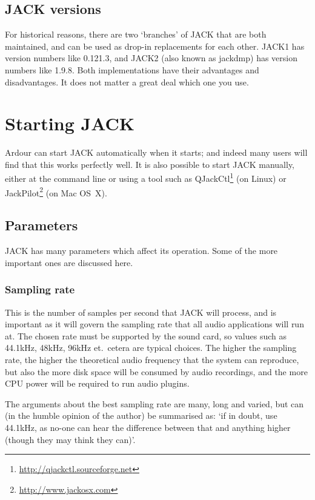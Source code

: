 \documentclass[10pt,a4paper]{book}
\begin{document}
{\subsection{JACK versions}

For historical reasons, there are two `branches' of JACK that are both
maintained, and can be used as drop-in replacements for each other.
JACK1 has version numbers like 0.121.3, and JACK2 (also known as
jackdmp) has version numbers like 1.9.8.  Both implementations have
their advantages and disadvantages.  It does not matter a great deal
which one you use.



\section{Starting JACK}

Ardour can start JACK automatically when it starts; and indeed many
users will find that this works perfectly well.  It is also possible
to start JACK manually, either at the command line or using a tool
such as QJackCtl\footnote{\url{http://qjackctl.sourceforge.net}} (on
Linux) or JackPilot\footnote{\url{http://www.jackosx.com}} (on Mac
OS~X).

\subsection{Parameters}

JACK has many parameters which affect its operation.  Some of the more
important ones are discussed here.

\subsubsection{Sampling rate}

This is the number of samples per second that JACK will process, and
is important as it will govern the sampling rate that all audio
applications will run at.  The chosen rate must be supported
by the sound card, so values such as 44.1kHz, 48kHz, 96kHz
et.\ cetera are typical choices.  The higher the sampling rate, the
higher the theoretical audio frequency that the system can reproduce,
but also the more disk space will be consumed by audio recordings, and
the more CPU power will be required to run audio plugins.

The arguments about the best sampling rate are many, long and varied,
but can (in the humble opinion of the author) be summarised as: `if in
doubt, use 44.1kHz, as no-one can hear the difference between that and
anything higher (though they may think they can)'.

}
\end{document}
